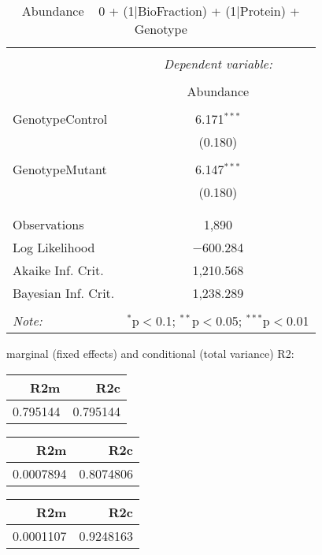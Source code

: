 \documentclass[11pt]{report}
\begin{document}
\begin{table}[!htbp] \centering 
  \caption{Abundance ~ 0 + (1|BioFraction) + (1|Protein) + Genotype} 
  \label{} 
\begin{tabular}{@{\extracolsep{5pt}}lc} 
\\[-1.8ex]\hline 
\hline \\[-1.8ex] 
 & \multicolumn{1}{c}{\textit{Dependent variable:}} \\ 
\cline{2-2} 
\\[-1.8ex] & Abundance \\ 
\hline \\[-1.8ex] 
 GenotypeControl & 6.171$^{***}$ \\ 
  & (0.180) \\ 
  & \\ 
 GenotypeMutant & 6.147$^{***}$ \\ 
  & (0.180) \\ 
  & \\ 
\hline \\[-1.8ex] 
Observations & 1,890 \\ 
Log Likelihood & $-$600.284 \\ 
Akaike Inf. Crit. & 1,210.568 \\ 
Bayesian Inf. Crit. & 1,238.289 \\ 
\hline 
\hline \\[-1.8ex] 
\textit{Note:}  & \multicolumn{1}{r}{$^{*}$p$<$0.1; $^{**}$p$<$0.05; $^{***}$p$<$0.01} \\ 
\end{tabular} 
\end{table} 
marginal (fixed effects) and conditional (total variance) R2:

\begin{tabular}{r|r}
\hline
R2m & R2c\\
\hline
0.795144 & 0.795144\\
\hline
\end{tabular}

\begin{tabular}{r|r}
\hline
R2m & R2c\\
\hline
0.0007894 & 0.8074806\\
\hline
\end{tabular}

\begin{tabular}{r|r}
\hline
R2m & R2c\\
\hline
0.0001107 & 0.9248163\\
\hline
\end{tabular}
\end{document}
